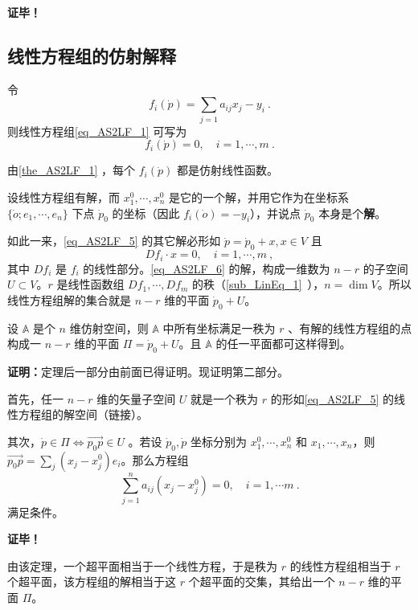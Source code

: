 \textbf{证毕！}
\subsection{线性方程组的仿射解释}
令
\begin{equation}\label{eq_AS2LF_7}
f_i(\dot p)=\sum_{j=1}a_{ij}x_j-y_i~.
\end{equation}
则线性方程组\autoref{eq_AS2LF_1} 可写为
\begin{equation}\label{eq_AS2LF_5}
f_i(\dot p)=0,\quad i=1,\cdots,m~.
\end{equation}

由\autoref{the_AS2LF_1} ，每个 $f_i(\dot p)$ 都是仿射线性函数。

设线性方程组有解，而 $x_1^0,\cdots,x_n^0$ 是它的一个解，并用它作为在坐标系 $\{\dot o;e_1,\cdots,e_n\}$ 下点 $\dot p_0$ 的坐标（因此 $f_i(\dot o)=-y_i$），并说点 $\dot p_0$ 本身是个\textbf{解}。

如此一来，\autoref{eq_AS2LF_5} 的其它解必形如 $\dot p=\dot p_0+x, x\in V$ 且
\begin{equation}\label{eq_AS2LF_6}
 Df_i \cdot x=0,\quad i=1,\cdots,m~,
\end{equation}
其中 $Df_i$ 是 $f_i$ 的线性部分。\autoref{eq_AS2LF_6} 的解，构成一维数为 $n-r$ 的子空间 $U\subset V$。$r$ 是线性函数组 $Df_1,\cdots,Df_m$ 的秩（\autoref{sub_LinEq_1}~），$n=\dim V$。所以线性方程组解的集合就是 $n-r$ 维的平面 $\dot p_0+U$。

\begin{theorem}{}
设 $\mathbb A$ 是个 $n$ 维仿射空间，则 $\mathbb A$ 中所有坐标满足一秩为 $r$ 、有解的线性方程组的点构成一 $n-r$ 维的平面 $\Pi=\dot p_0+U$。且 $\mathbb A$ 的任一平面都可这样得到。
\end{theorem}
\textbf{证明：}定理后一部分由前面已得证明。现证明第二部分。

首先，任一 $n-r$ 维的矢量子空间 $U$ 就是一个秩为 $r$ 的形如\autoref{eq_AS2LF_5}  的线性方程组的解空间（链接）。

其次，$\dot p\in\Pi\Leftrightarrow\vec{p_0p}\in U$ 。若设 $\dot p_0,\dot p$ 坐标分别为 $x^0_1,\cdots,x^0_n$ 和 $x_1,\cdots,x_n$，则 $\vec{p_0p}=\sum_{j}(x_j-x^0_j)e_i$。那么方程组
\begin{equation}
\sum_{j=1}^n a_{ij}(x_j-x_j^0)=0,\quad i=1,\cdots m~.
\end{equation}
 满足条件。

 \textbf{证毕！}

由该定理，一个超平面相当于一个线性方程，于是秩为 $r$ 的线性方程组相当于 $r$ 个超平面，该方程组的解相当于这 $r$ 个超平面的交集，其给出一个 $n-r$ 维的平面 $\Pi$。